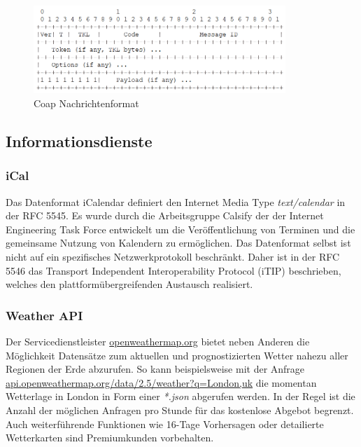 \begin{figure}
	\centering
	\includegraphics[width=0.85\textwidth]{figures/coap_msg.png}
	\caption{Coap Nachrichtenformat}
	\label{img:coap_msg}
\end{figure}


\subsection{Informationsdienste}
\label{subsec:webinfo}

\subsubsection{iCal}
\label{subsubsec:ical}

Das Datenformat iCalendar definiert den Internet Media Type \textit{text/calendar} in der RFC 5545. Es wurde durch die Arbeitsgruppe Calsify der der Internet Engineering Task Force entwickelt um die Veröffentlichung von Terminen und die gemeinsame Nutzung von Kalendern zu ermöglichen. Das Datenformat selbst ist nicht auf  ein spezifisches Netzwerkprotokoll beschränkt. Daher ist in der RFC 5546 das Transport Independent Interoperability Protocol (iTIP) beschrieben, welches den plattformübergreifenden Austausch realisiert. 

\subsubsection{Weather API}
\label{subsubsec:weather}

Der Servicedienstleister \url{openweathermap.org} bietet neben Anderen die Möglichkeit Datensätze zum aktuellen und prognostizierten Wetter nahezu aller Regionen der Erde abzurufen. So kann beispielsweise mit der Anfrage \url{api.openweathermap.org/data/2.5/weather?q=London,uk} die momentan Wetterlage in London in Form einer \textit{*.json} abgerufen werden. In der Regel ist die Anzahl der möglichen Anfragen pro Stunde für das kostenlose Abgebot begrenzt. Auch weiterführende Funktionen wie 16-Tage Vorhersagen oder detailierte Wetterkarten sind Premiumkunden vorbehalten.

